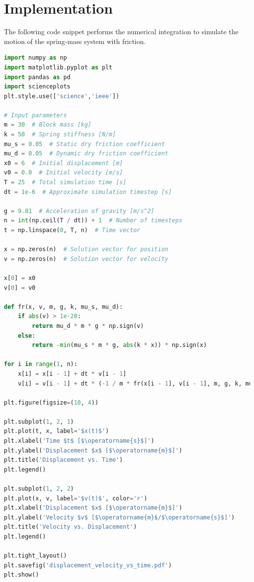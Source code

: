 \documentclass[12pt, a4paper, oneside]{report}
\begin{document}
\section{Implementation}

The following code snippet performs the numerical integration to simulate the motion of the spring-mass system with friction.

\begin{lstlisting}[language=Python, caption={Numerical Integration for Spring-Mass System with Friction}]
import numpy as np
import matplotlib.pyplot as plt
import pandas as pd
import scienceplots
plt.style.use(['science','ieee'])

# Input parameters
m = 30  # Block mass [kg]
k = 50  # Spring stiffness [N/m]
mu_s = 0.05  # Static dry friction coefficient
mu_d = 0.05  # Dynamic dry friction coefficient
x0 = 6  # Initial displacement [m]
v0 = 0.0  # Initial velocity [m/s]
T = 25  # Total simulation time [s]
dt = 1e-6  # Approximate simulation timestep [s]

g = 9.81  # Acceleration of gravity [m/s^2]
n = int(np.ceil(T / dt)) + 1  # Number of timesteps
t = np.linspace(0, T, n)  # Time vector

x = np.zeros(n)  # Solution vector for position
v = np.zeros(n)  # Solution vector for velocity

x[0] = x0
v[0] = v0

def fr(x, v, m, g, k, mu_s, mu_d):
    if abs(v) > 1e-20:
        return mu_d * m * g * np.sign(v)
    else:
        return -min(mu_s * m * g, abs(k * x)) * np.sign(x)

for i in range(1, n):
    x[i] = x[i - 1] + dt * v[i - 1]
    v[i] = v[i - 1] + dt * (-1 / m * fr(x[i - 1], v[i - 1], m, g, k, mu_s, mu_d) - k / m * x[i - 1])

plt.figure(figsize=(10, 4))

plt.subplot(1, 2, 1)
plt.plot(t, x, label='$x(t)$')
plt.xlabel('Time $t$ [$\operatorname{s}$]')
plt.ylabel('Displacement $x$ [$\operatorname{m}$]')
plt.title('Displacement vs. Time')
plt.legend()

plt.subplot(1, 2, 2)
plt.plot(x, v, label='$v(t)$', color='r')
plt.xlabel('Displacement $x$ [$\operatorname{m}$]')
plt.ylabel('Velocity $v$ [$\operatorname{m}$/$\operatorname{s}$]')
plt.title('Velocity vs. Displacement')
plt.legend()

plt.tight_layout()
plt.savefig('displacement_velocity_vs_time.pdf')
plt.show()
\end{lstlisting}
\end{document}
